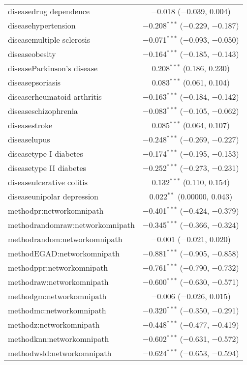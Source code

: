 \begin{table}[!htbp]
\begin{tabular}{@{\extracolsep{5pt}}lc}
  diseasedrug dependence & $-$0.018 ($-$0.039, 0.004) \\ 
  diseasehypertension & $-$0.208$^{***}$ ($-$0.229, $-$0.187) \\ 
  diseasemultiple sclerosis & $-$0.071$^{***}$ ($-$0.093, $-$0.050) \\ 
  diseaseobesity & $-$0.164$^{***}$ ($-$0.185, $-$0.143) \\ 
  diseaseParkinson's disease & 0.208$^{***}$ (0.186, 0.230) \\ 
  diseasepsoriasis & 0.083$^{***}$ (0.061, 0.104) \\ 
  diseaserheumatoid arthritis & $-$0.163$^{***}$ ($-$0.184, $-$0.142) \\ 
  diseaseschizophrenia & $-$0.083$^{***}$ ($-$0.105, $-$0.062) \\ 
  diseasestroke & 0.085$^{***}$ (0.064, 0.107) \\ 
  diseaselupus & $-$0.248$^{***}$ ($-$0.269, $-$0.227) \\ 
  diseasetype I diabetes & $-$0.174$^{***}$ ($-$0.195, $-$0.153) \\ 
  diseasetype II diabetes & $-$0.252$^{***}$ ($-$0.273, $-$0.231) \\ 
  diseaseulcerative colitis & 0.132$^{***}$ (0.110, 0.154) \\ 
  diseaseunipolar depression & 0.022$^{**}$ (0.00000, 0.043) \\ 
  methodpr:networkomnipath & $-$0.401$^{***}$ ($-$0.424, $-$0.379) \\ 
  methodrandomraw:networkomnipath & $-$0.345$^{***}$ ($-$0.366, $-$0.324) \\ 
  methodrandom:networkomnipath & $-$0.001 ($-$0.021, 0.020) \\ 
  methodEGAD:networkomnipath & $-$0.881$^{***}$ ($-$0.905, $-$0.858) \\ 
  methodppr:networkomnipath & $-$0.761$^{***}$ ($-$0.790, $-$0.732) \\ 
  methodraw:networkomnipath & $-$0.600$^{***}$ ($-$0.630, $-$0.571) \\ 
  methodgm:networkomnipath & $-$0.006 ($-$0.026, 0.015) \\ 
  methodmc:networkomnipath & $-$0.320$^{***}$ ($-$0.350, $-$0.291) \\ 
  methodz:networkomnipath & $-$0.448$^{***}$ ($-$0.477, $-$0.419) \\ 
  methodknn:networkomnipath & $-$0.602$^{***}$ ($-$0.631, $-$0.572) \\ 
  methodwsld:networkomnipath & $-$0.624$^{***}$ ($-$0.653, $-$0.594) \\ 

\end{tabular}
\end{table}
